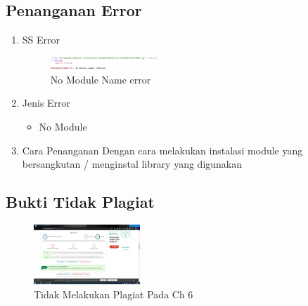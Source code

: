 \subsection{Penanganan Error}
\begin{enumerate}
	\item SS Error
	\begin{figure}[H]
		\includegraphics[width=4cm]{figures/1174027/error/6_no_module.png}
		\centering
		\caption{No Module Name error}
	\end{figure}
	\item Jenis Error
	\begin{itemize}
		\item No Module
	\end{itemize}
	\item Cara Penanganan
	\hfill\break
	Dengan cara melakukan instalasi module yang bersangkutan / menginstal library yang digunakan
\end{enumerate}
\subsection{Bukti Tidak Plagiat}
\begin{figure}[H]
    \includegraphics[width=4cm]{figures/1174027/bukti/6.png}
    \centering
    \caption{Tidak Melakukan Plagiat Pada Ch 6}
\end{figure}
